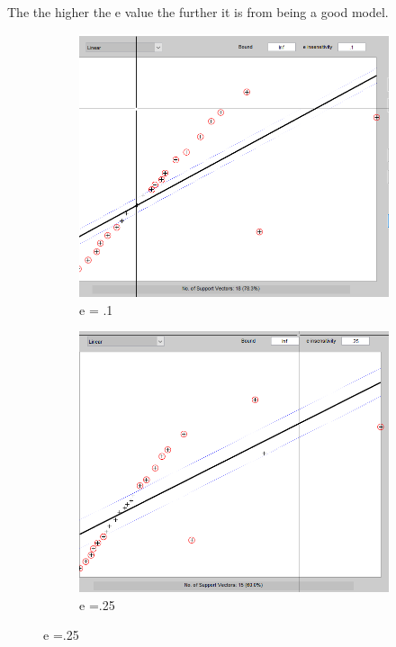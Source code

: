 \documentclass[11pt,oneside,a4paper]{article}
\begin{document}
The the higher the e value the further it is from being a good model. 
\begin{figure}[H]
	\begin{subfigure}[b]{0.4\textwidth}
		\includegraphics[width=\textwidth]{../Figures/linear_1}
		\caption{e = .1}
	\end{subfigure}
	\begin{subfigure}[b]{0.4\textwidth}
		\includegraphics[width=\textwidth]{../Figures/linear_25}
		\caption{e =.25}
	\end{subfigure}

\end{figure}
\end{document}
